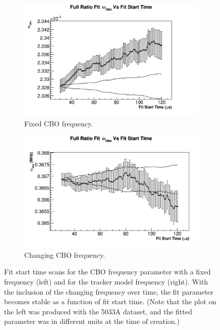 		\begin{figure}[]
		\centering
		    \begin{subfigure}[t]{0.45\textwidth}
			    \centering
				\includegraphics[width=\textwidth]{fixed-wcbo-vs-fs}
			    \caption{Fixed CBO frequency.}
		    \end{subfigure}
		    \hspace{4mm}
		    \begin{subfigure}[t]{0.45\textwidth}
			    \centering
				\includegraphics[width=\textwidth]{RatioCBO_omega_cbo_FS_Canv}
			    \caption{Changing CBO frequency.}
		    \end{subfigure}
		\caption[CBOFreqModel]{Fit start time scans for the CBO frequency parameter with a fixed frequency (left) and for the tracker model frequency (right). With the inclusion of the changing frequency over time, the fit parameter becomes stable as a function of fit start time. (Note that the plot on the left was produced with the 5033A dataset, and the fitted parameter was in different units at the time of creation.)}
		\label{fig:CBOFreqModel}
		\end{figure}


